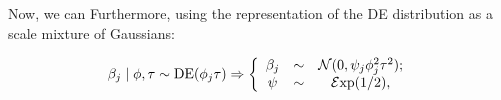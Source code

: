\documentclass[10pt]{article}
\begin{document}

Now, we can Furthermore, using the representation of the \rm{DE} distribution as a scale mixture of Gaussians: 

\[
\beta_j \mid \phi , \tau \sim \text{\rm{DE}}(\phi_j \tau) \Rightarrow \left\{ \begin{array}{ccc}
\beta_j & \sim & \mathcal{N}(0 , \psi_j\phi^2_j\tau^2); \\
\psi & \sim & \mathcal{E}\mathrm{xp}(1/2),
\end{array} \right. 
\] 
\end{document}

